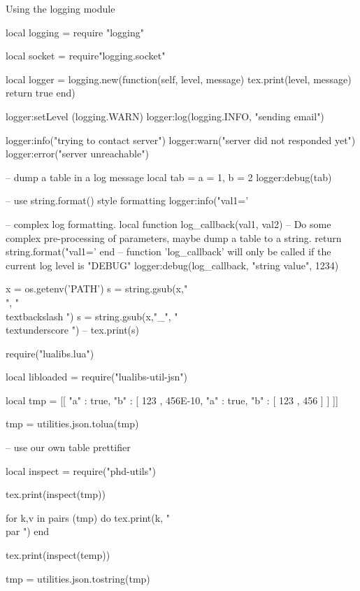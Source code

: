  
\begin{texexample}{Using the logging module}{}
\begin{luacode}
local logging = require "logging"

local socket = require"logging.socket"

local logger = logging.new(function(self, level, message)
                             tex.print(level, message)
                             return true
                           end)
                           
logger:setLevel (logging.WARN)
logger:log(logging.INFO, "sending email")

logger:info("trying to contact server")
logger:warn("server did not responded yet")
logger:error("server unreachable")

-- dump a table in a log message
local tab = { a = 1, b = 2 }
logger:debug(tab)

-- use string.format() style formatting
logger:info("val1='%

-- complex log formatting.
local function log_callback(val1, val2)
	-- Do some complex pre-processing of parameters, maybe dump a table to a string.
	return string.format("val1='%
end
-- function 'log_callback' will only be called if the current log level is "DEBUG"
logger:debug(log_callback, "string value", 1234)

x = os.getenv('PATH')
s = string.gsub(x,"\\", "\\textbackslash ")
s = string.gsub(x,"_", "\\textunderscore ")
-- tex.print(s)

require("lualibs.lua")

local libloaded = require("lualibs-util-jsn")

local tmp = [[ { "a" : true, "b" : [ 123 , 456E-10, { "a" : true, "b" : [ 123 , 456 ] } ] } ]]

 tmp = utilities.json.tolua(tmp)
 
 
 -- use our own table prettifier
 
 local inspect = require("phd-utils")
 
tex.print(inspect(tmp))
 
 for k,v in pairs (tmp) do
    tex.print(k, " \\par ")
 end
 
tex.print(inspect(temp))

tmp = utilities.json.tostring(tmp)


\end{luacode}
\end{texexample}
